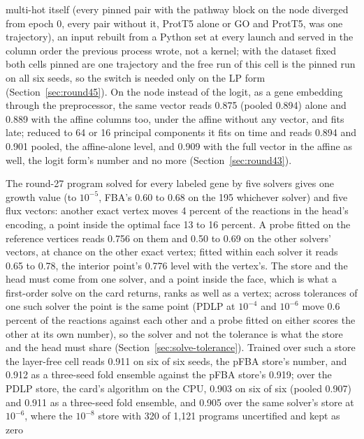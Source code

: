 \begin{description}
    multi-hot itself (every pinned pair with the pathway block on the node diverged
    from epoch 0, every pair without it, ProtT5 alone or GO and ProtT5, was one
    trajectory), an input rebuilt from a Python set at every launch and served in the
    column order the previous process wrote, not a kernel; with the dataset fixed
    both cells pinned are one trajectory and the free run of this cell is the pinned
    run on all six seeds, so the switch is needed only on the LP form
    (Section~\ref{sec:round45}). On the node
    instead of the logit, as a gene embedding through the preprocessor, the same
    vector reads 0.875 (pooled 0.894) alone and 0.889 with the affine columns too,
    under the affine without any vector, and fits late; reduced to 64 or 16
    principal components it fits on time and reads 0.894 and 0.901 pooled, the
    affine-alone level, and 0.909 with the full vector in the affine as well, the
    logit form's number and no more (Section~\ref{sec:round43}).
  \item[The solve's argmax is not unique, and the head reads the solver's point.]
    The round-27 program solved for every labeled gene by five solvers gives one
    growth value (to $10^{-5}$, FBA's 0.60 to 0.68 on the 195 whichever solver) and
    five flux vectors: another exact vertex moves 4 percent of the reactions in the
    head's encoding, a point inside the optimal face 13 to 16 percent. A probe fitted
    on the reference vertices reads 0.756 on them and 0.50 to 0.69 on the other
    solvers' vectors, at chance on the other exact vertex; fitted within each solver it
    reads 0.65 to 0.78, the interior point's 0.776 level with the vertex's. The store
    and the head must come from one solver, and a point inside the face, which is
    what a first-order solve on the card returns, ranks as well as a vertex; across
    tolerances of one such solver the point is the same point (PDLP at $10^{-4}$ and
    $10^{-6}$ move 0.6 percent of the reactions against each other and a probe
    fitted on either scores the other at its own number), so the solver and not the
    tolerance is what the store and the head must share
    (Section~\ref{sec:solve-tolerance}). Trained over such a store the layer-free
    cell reads 0.911 on six of six seeds, the pFBA store's number, and 0.912 as a
    three-seed fold ensemble against the pFBA store's 0.919; over the PDLP store, the
    card's algorithm on the CPU, 0.903 on six of six (pooled 0.907) and 0.911 as a
    three-seed fold ensemble, and 0.905 over the same solver's store at $10^{-6}$,
    where the $10^{-8}$ store with 320 of 1,121 programs uncertified and kept as zero

\end{description}
